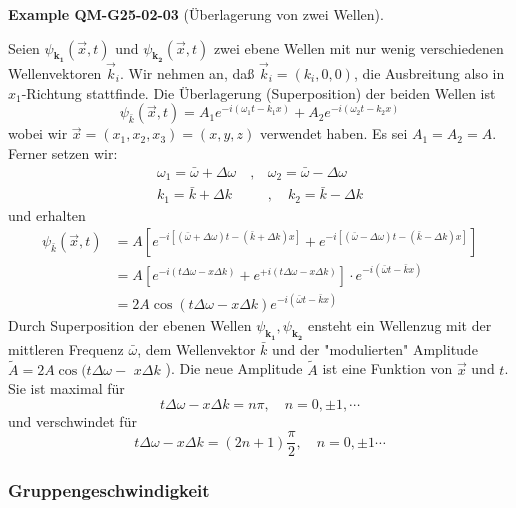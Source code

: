 \documentclass[10pt, letterpaper]{article}
\newcommand{\CustomHeading}[3]{%
  \par\medskip\noindent%
  \textbf{#1 #2} \textnormal{(#3)}.\enskip%
}
\newenvironment{EXA}[2]{\begin{unitbox}\CustomHeading{Example}{#1}{#2}}{\end{unitbox}}
\begin{document}
\begin{EXA}{QM-G25-02-03}{Überlagerung von zwei Wellen}
Seien $\psi_{\mathbf{k}_{\mathbf{1}}}(\vec{x}, t)$ und $\psi_{\mathbf{k}_{\mathbf{2}}}(\vec{x}, t)$ zwei ebene Wellen mit nur wenig verschiedenen Wellenvektoren $\vec{k}_{i}$. Wir nehmen an, daß $\vec{k}_{i}=\left(k_{i}, 0,0\right)$, die Ausbreitung also in $x_{1}$-Richtung stattfinde. Die Überlagerung (Superposition) der beiden Wellen ist
$$
\psi_{\bar{k}}(\vec{x}, t)=A_{1} e^{-i\left(\omega_{1} t-k_{1} x\right)}+A_{2} e^{-i\left(\omega_{2} t-k_{2} x\right)}
$$
wobei wir $\vec{x}=\left(x_{1}, x_{2}, x_{3}\right)=(x, y, z)$ verwendet haben. Es sei $A_{1}=A_{2}=A$. Ferner setzen wir:
$$
\begin{array}{cc}
\omega_{1}=\bar{\omega}+\Delta \omega \quad, & \omega_{2}=\bar{\omega}-\Delta \omega \\
k_{1}=\bar{k}+\Delta k & , \quad k_{2}=\bar{k}-\Delta k
\end{array}
$$
und erhalten
$$
\begin{aligned}
\psi_{\bar{k}}(\vec{x}, t) & =A\left[e^{-i[(\bar{\omega}+\Delta \omega) t-(\bar{k}+\Delta k) x]}+e^{-i[(\bar{\omega}-\Delta \omega) t-(\bar{k}-\Delta k) x]}\right] \\
& =A\left[e^{-i(t \Delta \omega-x \Delta k)}+e^{+i(t \Delta \omega-x \Delta k)}\right] \cdot e^{-i(\bar{\omega} t-\bar{k} x)} \\
& =2 A \cos (t \Delta \omega-x \Delta k) e^{-i(\bar{\omega} t-\bar{k} x)}
\end{aligned}
$$
Durch Superposition der ebenen Wellen $\psi_{\mathbf{k}_{\mathbf{1}}}, \psi_{\mathbf{k}_{\mathbf{2}}}$ ensteht ein Wellenzug mit der mittleren Frequenz $\bar{\omega}$, dem Wellenvektor $\bar{k}$ und der "modulierten" Amplitude $\tilde{A}=2 A \cos (t \Delta \omega-$ $x \Delta k$ ). Die neue Amplitude $\tilde{A}$ ist eine Funktion von $\vec{x}$ und $t$. Sie ist maximal für
$$
t \Delta \omega-x \Delta k=n \pi, \quad n=0, \pm 1, \cdots
$$
und verschwindet für
$$
t \Delta \omega-x \Delta k=(2 n+1) \frac{\pi}{2}, \quad n=0, \pm 1 \cdots
$$
\end{EXA}

\subsubsection*{Gruppengeschwindigkeit}
\end{document}
